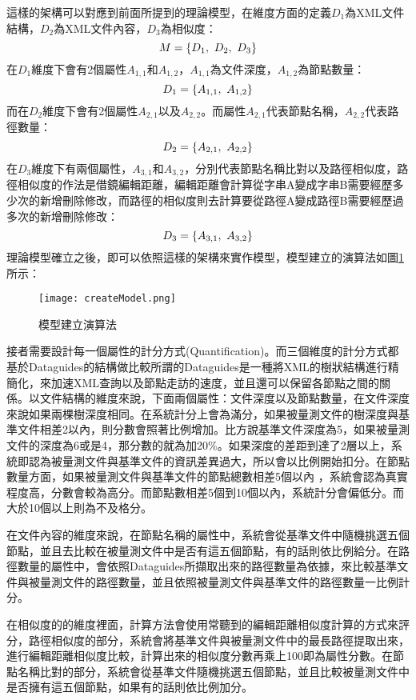 這樣的架構可以對應到前面所提到的理論模型，在維度方面的定義$D_1$為XML文件結構，$D_2$為XML文件內容，$D_3$為相似度：
$$
M=\{D_1,\ D_2,\ D_3\}\\
$$
在$D_1$維度下會有2個屬性$A_{1,1}$和$A_{1,2}$，$A_{1,1}$為文件深度，$A_{1,2}$為節點數量：
$$
D_1=\{A_{1,1},\ A_{1,2}\}\\
$$
而在$D_2$維度下會有2個屬性$A_{2,1}$以及$A_{2,2}$。而屬性$A_{2,1}$代表節點名稱，$A_{2,2}$代表路徑數量：
$$
D_2=\{A_{2,1},\ A_{2,2}\}\\
$$
在$D_3$維度下有兩個屬性，$A_{3,1}$和$A_{3,2}$，分別代表節點名稱比對以及路徑相似度\cite{ristad1998learning}，路徑相似度的作法是借鏡編輯距離，編輯距離會計算從字串A變成字串B需要經歷多少次的新增刪除修改，而路徑的相似度則去計算要從路徑A變成路徑B需要經歷過多次的新增刪除修改：
$$
D_3=\{A_{3,1},\ A_{3,2}\}\\
$$
理論模型確立之後，即可以依照這樣的架構來實作模型，模型建立的演算法如圖\ref{createmodel}所示：
\begin{figure}[H]
\centering
\graphicspath{{/Users/FUDA/Documents/masterThesis/image/}}
\texttt{[image: createModel.png]}
\caption{模型建立演算法}
\label{createmodel}
\end{figure}
接者需要設計每一個屬性的計分方式(Quantification)。而三個維度的計分方式都基於Dataguides\cite{oem}\cite{dataguides}\cite{oemweb}的結構做比較所謂的Dataguides是一種將XML的樹狀結構進行精簡化，來加速XML查詢以及節點走訪的速度，並且還可以保留各節點之間的關係。以文件結構的維度來說，下面兩個屬性：文件深度以及節點數量，在文件深度來說如果兩棵樹深度相同。在系統計分上會為滿分，如果被量測文件的樹深度與基準文件相差2以內，則分數會照著比例增加。比方說基準文件深度為5，如果被量測文件的深度為6或是4，那分數的就為加20\%。如果深度的差距到達了2層以上，系統即認為被量測文件與基準文件的資訊差異過大，所以會以比例開始扣分。在節點數量方面，如果被量測文件與基準文件的節點總數相差5個以內 ，系統會認為真實程度高，分數會較為高分。而節點數相差5個到10個以內，系統計分會偏低分。而大於10個以上則為不及格分。\\\par

在文件內容的維度來說，在節點名稱的屬性中，系統會從基準文件中隨機挑選五個節點，並且去比較在被量測文件中是否有這五個節點，有的話則依比例給分。在路徑數量的屬性中，會依照Dataguides所擷取出來的路徑數量為依據，來比較基準文件與被量測文件的路徑數量，並且依照被量測文件與基準文件的路徑數量一比例計分。\\\par

在相似度的的維度裡面，計算方法會使用常聽到的編輯距離相似度計算\cite{ristad1998learning}的方式來評分，路徑相似度的部分，系統會將基準文件與被量測文件中的最長路徑提取出來，進行編輯距離相似度比較，計算出來的相似度分數再乘上100即為屬性分數。在節點名稱比對的部分，系統會從基準文件隨機挑選五個節點，並且比較被量測文件中是否擁有這五個節點，如果有的話則依比例加分。

